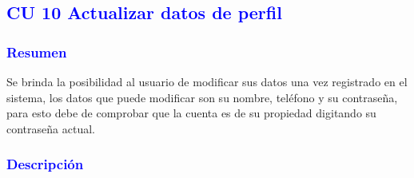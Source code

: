 

\newpage
\subsection{\textcolor{blue}{CU 10 Actualizar datos de perfil}}

\subsubsection{\textcolor{blue}{Resumen}}
Se brinda la posibilidad al usuario de modificar sus datos una vez registrado en el sistema, los datos que puede modificar son su nombre, teléfono y su contraseña, para esto debe de comprobar que la cuenta es de su propiedad digitando su contraseña actual.
\subsubsection{\textcolor{blue}{Descripción}}

